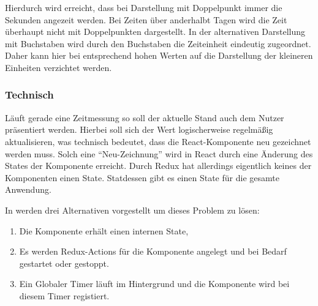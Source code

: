 

Hierdurch wird erreicht, dass bei Darstellung mit Doppelpunkt immer die Sekunden angezeit werden.
Bei Zeiten über anderhalbt Tagen wird die Zeit überhaupt nicht mit Doppelpunkten dargestellt.
In der alternativen Darstellung mit Buchstaben wird durch den Buchstaben die Zeiteinheit eindeutig zugeordnet.
Daher kann hier bei entsprechend hohen Werten auf die Darstellung der kleineren Einheiten verzichtet werden.

\subsubsection{Technisch}
Läuft gerade eine Zeitmessung so soll der aktuelle Stand auch dem Nutzer präsentiert werden.
Hierbei soll sich der Wert logischerweise regelmäßig aktualisieren,
was technisch bedeutet, dass die React-Komponente neu gezeichnet werden muss.
Solch eine \enquote{Neu-Zeichnung} wird in React durch eine Änderung des States der Komponente erreicht.
Durch Redux hat allerdings eigentlich keines der Komponenten einen State.
Statdessen gibt es einen State für die gesamte Anwendung.

In \cite{Timersin85:online} werden drei Alternativen vorgestellt um dieses Problem zu lösen:
\begin{enumerate}
    \item Die Komponente erhält einen internen State,
    \item Es werden Redux-Actions für die Komponente angelegt und bei Bedarf gestartet oder gestoppt.
    \item Ein Globaler Timer läuft im Hintergrund und die Komponente wird bei diesem Timer registiert.
\end{enumerate}

